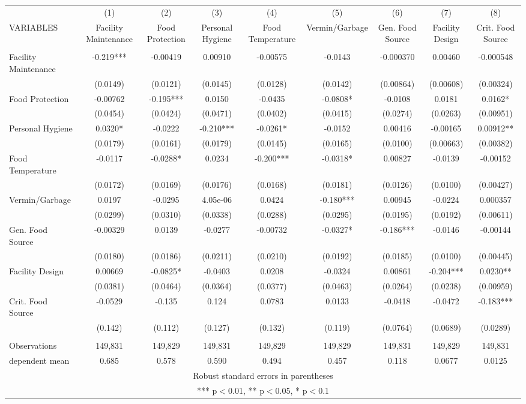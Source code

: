 \begin{tabular}{lcccccccc} \hline
 & (1) & (2) & (3) & (4) & (5) & (6) & (7) & (8) \\
VARIABLES & Facility Maintenance & Food Protection & Personal Hygiene & Food Temperature & Vermin/Garbage & Gen. Food Source & Facility Design & Crit. Food Source \\ \hline
 &  &  &  &  &  &  &  &  \\
Facility Maintenance & -0.219*** & -0.00419 & 0.00910 & -0.00575 & -0.0143 & -0.000370 & 0.00460 & -0.000548 \\
 & (0.0149) & (0.0121) & (0.0145) & (0.0128) & (0.0142) & (0.00864) & (0.00608) & (0.00324) \\
Food Protection & -0.00762 & -0.195*** & 0.0150 & -0.0435 & -0.0808* & -0.0108 & 0.0181 & 0.0162* \\
 & (0.0454) & (0.0424) & (0.0471) & (0.0402) & (0.0415) & (0.0274) & (0.0263) & (0.00951) \\
Personal Hygiene & 0.0320* & -0.0222 & -0.210*** & -0.0261* & -0.0152 & 0.00416 & -0.00165 & 0.00912** \\
 & (0.0179) & (0.0161) & (0.0179) & (0.0145) & (0.0165) & (0.0100) & (0.00663) & (0.00382) \\
Food Temperature & -0.0117 & -0.0288* & 0.0234 & -0.200*** & -0.0318* & 0.00827 & -0.0139 & -0.00152 \\
 & (0.0172) & (0.0169) & (0.0176) & (0.0168) & (0.0181) & (0.0126) & (0.0100) & (0.00427) \\
Vermin/Garbage & 0.0197 & -0.0295 & 4.05e-06 & 0.0424 & -0.180*** & 0.00945 & -0.0224 & 0.000357 \\
 & (0.0299) & (0.0310) & (0.0338) & (0.0288) & (0.0295) & (0.0195) & (0.0192) & (0.00611) \\
Gen. Food Source & -0.00329 & 0.0139 & -0.0277 & -0.00732 & -0.0327* & -0.186*** & -0.0146 & -0.00144 \\
 & (0.0180) & (0.0186) & (0.0211) & (0.0210) & (0.0192) & (0.0185) & (0.0100) & (0.00445) \\
Facility Design & 0.00669 & -0.0825* & -0.0403 & 0.0208 & -0.0324 & 0.00861 & -0.204*** & 0.0230** \\
 & (0.0381) & (0.0464) & (0.0364) & (0.0377) & (0.0463) & (0.0264) & (0.0238) & (0.00959) \\
Crit. Food Source & -0.0529 & -0.135 & 0.124 & 0.0783 & 0.0133 & -0.0418 & -0.0472 & -0.183*** \\
 & (0.142) & (0.112) & (0.127) & (0.132) & (0.119) & (0.0764) & (0.0689) & (0.0289) \\
 &  &  &  &  &  &  &  &  \\
Observations & 149,831 & 149,829 & 149,831 & 149,829 & 149,829 & 149,831 & 149,829 & 149,831 \\
 dependent mean & 0.685 & 0.578 & 0.590 & 0.494 & 0.457 & 0.118 & 0.0677 & 0.0125 \\ \hline
\multicolumn{9}{c}{ Robust standard errors in parentheses} \\
\multicolumn{9}{c}{ *** p$<$0.01, ** p$<$0.05, * p$<$0.1} \\
\end{tabular}

